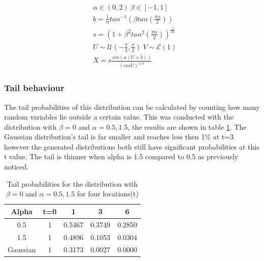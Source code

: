 \documentclass[twoside,twocolumn]{article}
\begin{document}
\begin{equation}
\label{eq:4equ}
\begin{split}
&\alpha \in (0,2) \: \beta \in [-1,1]\\
&b=\frac{1}{\alpha}tan^{-1}(\beta tan(\frac{\pi\alpha}{2}))\\
&s=(1+\beta^2tan^2(\frac{\pi\alpha}{2}))^{\frac{1}{2\alpha}}\\
&U\sim\mathcal{U}(-\frac{\pi}{2},\frac{\pi}{2})\:V\sim\mathcal{E}(1)\\
& X=s\frac{sin(\alpha(U+b))}{(cosU)^{1/\alpha}}%
\end{split}
\end{equation}
\subsubsection{Tail behaviour }
The tail probabilities of this distribution can be calculated by counting how many random variables lie outside a certain value. This was conducted with the distribution with $\beta = 0 $ and $ \alpha =0.5 , 1.5$, the results are shown in table \ref{table:tail}. The Gaussian distribution's tail is far smaller and reaches less then 1\% at t=3 however the generated distributions both still have significant probabilities at this t value. The tail is thinner when alpha is 1.5 compared to 0.5 as previously noticed.  

\begin{table}[h]
\caption{Tail probabilities for the distribution with $\beta = 0 $ and $\alpha =0.5 , 1.5$ for four locations(t)}
\centering
\begin{tabular}{ c | c | c | c | c}
Alpha & t=0 & 1 & 3 & 6 \\

\midrule
0.5 & 1 & 0.5467 & 0.3749 & 0.2850 \\
1.5 & 1 & 0.4896 & 0.1053 & 0.0304\\
Gaussian & 1 & 0.3173&0.0027 &0.0000 \\
\end{tabular}
\label{table:tail}
\end{table}
\end{document}

